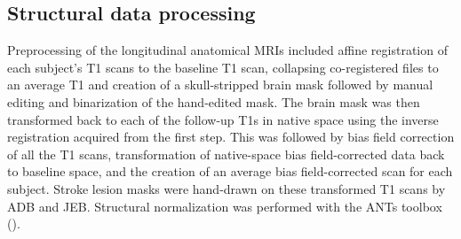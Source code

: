 \documentclass[phd,tocprelim]{cornell}
\begin{document}
 
    	 
	\subsection{Structural data processing}
	Preprocessing of the longitudinal anatomical MRIs included affine registration of each subject’s T1 scans to the baseline T1 scan, collapsing co-registered files to an average T1 and creation of a skull-stripped brain mask followed by manual editing and binarization of the hand-edited mask. The brain mask was then transformed back to each of the follow-up T1s in native space using the inverse registration acquired from the first step. This was followed by bias field correction of all the T1 scans, transformation of native-space bias field-corrected data back to baseline space, and the creation of an average bias field-corrected scan for each subject. Stroke lesion masks were hand-drawn on these transformed T1 scans by ADB and JEB. Structural normalization was performed with the ANTs toolbox (\cite{Avants2011-bl}).
	
\end{document}
